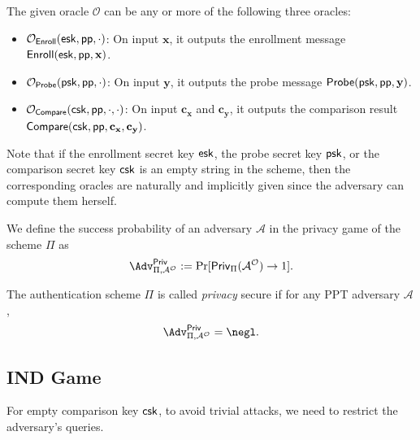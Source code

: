 The given oracle $\mathcal{O}$ can be any or more of the following three oracles:


\begin{itemize}

	\item $\mathcal{O}_{\sf Enroll}({\sf esk}, {\sf pp}, \cdot)$: On input $\mathbf{x}$, it outputs the enrollment message ${\sf Enroll}({\sf esk}, {\sf pp}, \mathbf{x})$.

	\item $\mathcal{O}_{\sf Probe}({\sf psk}, {\sf pp}, \cdot)$: On input $\mathbf{y}$, it outputs the probe message ${\sf Probe}({\sf psk}, {\sf pp}, \mathbf{y})$.

	\item $\mathcal{O}_{\sf Compare}({\sf csk}, {\sf pp}, \cdot, \cdot)$: On input $\mathbf{c_x}$ and $\mathbf{c_y}$, it outputs the comparison result ${\sf Compare}( {\sf csk}, {\sf pp}, \mathbf{c_x}, \mathbf{c_y} )$.

\end{itemize}

Note that if the enrollment secret key ${\sf esk}$, the probe secret key ${\sf psk}$, or the comparison secret key ${\sf csk}$ is an empty string in the scheme, then the corresponding oracles are naturally and implicitly given since the adversary can compute them herself.

We define the success probability of an adversary $\mathcal{A}$ in the privacy game of the scheme $\Pi$ as
\[
	\Adv^{\sf Priv}_{\Pi, \mathcal{A}^\mathcal{O}} := \Pr[{\sf Priv}_{\Pi}(\mathcal{A}^\mathcal{O}) \to 1].
\]

The authentication scheme $\Pi$ is called \emph{privacy} secure if for any PPT adversary $\mathcal{A}$,
\[
	\Adv^{\sf Priv}_{\Pi, \mathcal{A}^\mathcal{O}} = \negl.
\]


\subsection*{IND Game}
For empty comparison key ${\sf csk}$, to avoid trivial attacks, we need to restrict the adversary's queries.

